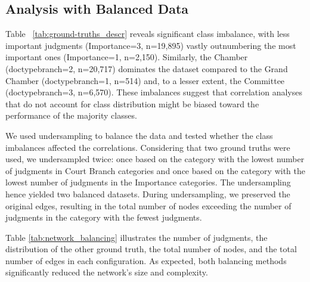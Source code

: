 \documentclass[sigconf,authordraft]{acmart}
\begin{document}
\subsection{Analysis with Balanced Data}

Table ~\ref{tab:ground-truths_descr} reveals significant class imbalance, with less important judgments (Importance=3, n=19,895) vastly outnumbering the most important ones (Importance=1, n=2,150). Similarly, the Chamber (doctypebranch=2, n=20,717) dominates the dataset compared to the Grand Chamber (doctypebranch=1, n=514) and, to a lesser extent, the Committee (doctypebranch=3, n=6,570). These imbalances suggest that correlation analyses that do not account for class distribution might be biased toward the performance of the majority classes.

We used undersampling to balance the data and tested whether the class imbalances affected the correlations. Considering that two ground truths were used, we undersampled twice: once based on the category with the lowest number of judgments in Court Branch categories and once based on the category with the lowest number of judgments in the Importance categories. The undersampling hence yielded two balanced datasets. During undersampling, we preserved the original edges, resulting in the total number of nodes exceeding the number of judgments in the category with the fewest judgments.

Table \ref{tab:network_balancing} illustrates the number of judgments, the distribution of the other ground truth, the total number of nodes, and the total number of edges in each configuration. As expected, both balancing methods significantly reduced the network's size and complexity.
\end{document}
